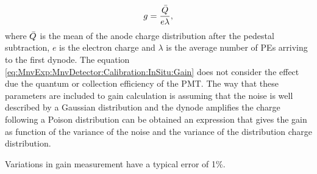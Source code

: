 \begin{itemize}
    \begin{equation}
        g=\frac{\Bar{Q}}{e\lambda},
        \label{eq:MnvExp:MnvDetector:Calibration:InSitu:Gain}
    \end{equation}
    where $\Bar{Q}$ is the mean of the anode charge distribution after the pedestal subtraction, $e$ is the electron charge and $\lambda$ is the average number of PEs arriving to the first dynode. The equation \ref{eq:MnvExp:MnvDetector:Calibration:InSitu:Gain} does not consider the effect due the quantum or collection efficiency of the PMT. The way that these parameters are included to gain calculation is assuming that the noise is well described by a Gaussian distribution and the dynode amplifies the charge following a Poison distribution can be obtained an expression that gives the gain as function of the variance of the noise and the variance of the distribution charge distribution.
    
    Variations in gain measurement have a typical error of 1\%. 
    

\end{itemize}
